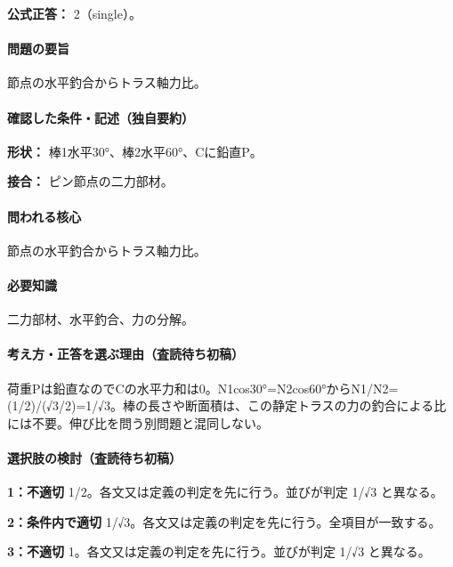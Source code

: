 \textbf{公式正答：} 2（single）。

\paragraph{問題の要旨} 節点の水平釣合からトラス軸力比。

\paragraph{確認した条件・記述（独自要約）}\mbox{}\par

\noindent\textbf{形状：} 棒1水平30°、棒2水平60°、Cに鉛直P。\par

\noindent\textbf{接合：} ピン節点の二力部材。\par

\paragraph{問われる核心} 節点の水平釣合からトラス軸力比。

\paragraph{必要知識} 二力部材、水平釣合、力の分解。

\paragraph{考え方・正答を選ぶ理由（査読待ち初稿）} 荷重Pは鉛直なのでCの水平力和は0。N1cos30°=N2cos60°からN1/N2=\allowbreak{}(1/2)/(√3/2)=\allowbreak{}1/√3。棒の長さや断面積は、この静定トラスの力の釣合による比には不要。伸び比を問う別問題と混同しない。

\paragraph{選択肢の検討（査読待ち初稿）}\mbox{}\par

\noindent\textbf{1：不適切} 1/2。各文又は定義の判定を先に行う。並びが判定 1/√3 と異なる。\par

\noindent\textbf{2：条件内で適切} 1/√3。各文又は定義の判定を先に行う。全項目が一致する。\par

\noindent\textbf{3：不適切} 1。各文又は定義の判定を先に行う。並びが判定 1/√3 と異なる。\par

